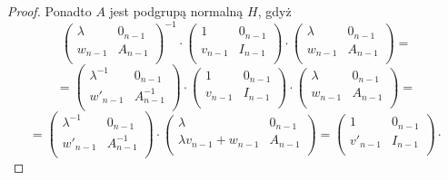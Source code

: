 \documentclass[licencjacka]{pracamgr}
\begin{document}
\begin{proof}
  Ponadto $A$ jest podgrupą normalną $H$, gdyż
  $$
    \left( \begin{array}{cc} \lambda & 0_{n-1} \\ w_{n-1} & A_{n-1} \\ \end{array} \right)^{-1} \cdot
    \left( \begin{array}{cc} 1 & 0_{n-1} \\ v_{n-1} & I_{n-1} \\ \end{array} \right)  \cdot
    \left( \begin{array}{cc} \lambda & 0_{n-1} \\ w_{n-1} & A_{n-1} \\ \end{array} \right) = 
  $$
  $$ = 
    \left( \begin{array}{cc} \lambda^{-1} & 0_{n-1} \\ w'_{n-1} & A^{-1}_{n-1} \\ \end{array} \right) \cdot
    \left( \begin{array}{cc} 1 & 0_{n-1} \\ v_{n-1} & I_{n-1} \\ \end{array} \right)  \cdot
    \left( \begin{array}{cc} \lambda & 0_{n-1} \\ w_{n-1} & A_{n-1} \\ \end{array} \right) = 
  $$
  $$ = 
    \left( \begin{array}{cc} \lambda^{-1} & 0_{n-1} \\ w'_{n-1} & A^{-1}_{n-1} \\ \end{array} \right) \cdot
    \left( \begin{array}{cc} \lambda & 0_{n-1} \\ \lambda v_{n-1} + w_{n-1} & A_{n-1} \\ \end{array} \right) = 
    \left( \begin{array}{cc} 1 & 0_{n-1} \\ v'_{n-1} & I_{n-1} \\ \end{array} \right)  \cdot
  $$
  

  


  
\end{proof}
\end{document}
